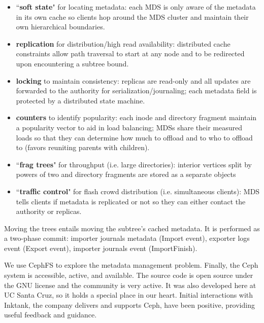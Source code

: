 \begin{itemize}

\item ``\textbf{soft state}" for locating metadata: each MDS is only aware of
the metadata in its own cache so clients hop around the MDS cluster and
maintain their own hierarchical boundaries.

\item \textbf{replication} for distribution/high read availability: distributed
cache constraints allow path traversal to start at any node and to be
redirected upon encountering a subtree bound.

\item \textbf{locking} to maintain consistency: replicas are read-only and all
updates are forwarded to the authority for serialization/journaling; each
metadata field is protected by a distributed state machine.

\item \textbf{counters} to identify popularity: each inode and directory
fragment maintain a popularity vector to aid in load balancing; MDSs share
their measured loads so that they can determine how much to offload and to who
to offload to (favors reuniting parents with children). 

\item ``\textbf{frag trees}" for throughput (i.e. large directories): interior
vertices split by powers of two and directory fragments are stored as a
separate objects

\item ``\textbf{traffic control}" for flash crowd distribution (i.e.
simultaneous clients): MDS tells clients if metadata is replicated or not so
they can either contact the authority or replicas.

\end{itemize}

Moving the trees entails moving the subtree's cached metadata. It is performed
as a two-phase commit: importer journals metadata (Import event), exporter logs
event (Export event), importer journals event (ImportFinish). 

We use CephFS to explore the metadata management problem.
Finally, the Ceph system is accessible, active, and available. The source code
is open source under the GNU license and the community is very active. It was
also developed here at UC Santa Cruz, so it holds a special place in our heart.
Initial interactions with Inktank, the company delivers and supports Ceph, have
been positive, providing useful feedback and guidance. 
